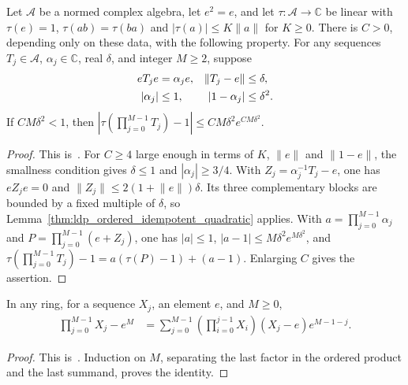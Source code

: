 \begin{lemma}
    \label{thm:ldp_ordered_compression_quadratic}
    \leanok
    Let $\mathcal A$ be a normed complex algebra, let $e^2=e$, and let
    $\tau:\mathcal A\to\mathbb C$ be linear with $\tau(e)=1$,
    $\tau(ab)=\tau(ba)$ and $|\tau(a)|\le K\lVert a\rVert$ for $K\ge0$.
    There is $C>0$, depending only on these data, with the following
    property. For any sequences $T_j\in\mathcal A$, $\alpha_j\in\mathbb C$,
    real $\delta$, and integer $M\ge2$, suppose
    \begin{align}
        eT_je      & =\alpha_je, & \lVert T_j-e\rVert & \le\delta, \notag \\
        |\alpha_j| & \le1,       & |1-\alpha_j|       & \le\delta^2.
        \label{eq:ldp_ordered_scalar_compression}
    \end{align}
    If $CM\delta^2<1$, then
    $\left|\tau(\prod_{j=0}^{M-1}T_j)-1\right|
        \le CM\delta^2e^{CM\delta^2}$.
\end{lemma}
\begin{proof}\leanok
    This is~\cite[``Ordered factors with scalar
        compression'']{QICLean2026Blueprint}.
    For $C\ge4$ large enough in terms of $K$, $\lVert e\rVert$ and
    $\lVert1-e\rVert$, the smallness condition gives
    $\delta\le1$ and $|\alpha_j|\ge3/4$. With
    $Z_j=\alpha_j^{-1}T_j-e$, one has $eZ_je=0$ and
    $\lVert Z_j\rVert\le2(1+\lVert e\rVert)\delta$.
    Its three complementary blocks are bounded by a fixed multiple of
    $\delta$, so Lemma~\ref{thm:ldp_ordered_idempotent_quadratic} applies.
    With $a=\prod_{j=0}^{M-1}\alpha_j$ and
    $P=\prod_{j=0}^{M-1}(e+Z_j)$, one has $|a|\le1$,
    $|a-1|\le M\delta^2e^{M\delta^2}$, and
    $\tau(\prod_{j=0}^{M-1}T_j)-1=a(\tau(P)-1)+(a-1)$.
    Enlarging $C$ gives the assertion.
\end{proof}

\begin{lemma}
    \label{thm:ldp_ordered_telescoping_identity}
    \leanok
    In any ring, for a sequence $X_j$, an element $e$, and $M\ge0$,
    \begin{align}
        \prod_{j=0}^{M-1}X_j-e^M
         & =\sum_{j=0}^{M-1}
        \left(\prod_{i=0}^{j-1}X_i\right)(X_j-e)e^{M-1-j}.
        \label{eq:ldp_ordered_telescoping_identity}
    \end{align}
\end{lemma}
\begin{proof}\leanok
    This is~\cite[``Telescoping an ordered product'']{QICLean2026Blueprint}.
    Induction on $M$, separating the last factor in the ordered product and
    the last summand, proves the identity.
\end{proof}

